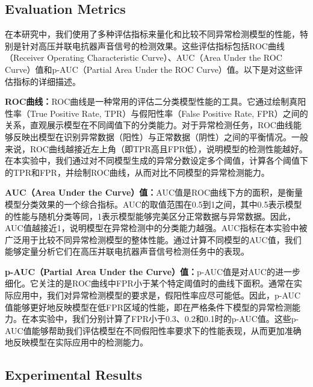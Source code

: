 \documentclass{article}
\begin{document}
\subsection{Evaluation Metrics}

在本研究中，我们使用了多种评估指标来量化和比较不同异常检测模型的性能，特别是针对高压并联电抗器声音信号的检测效果。这些评估指标包括ROC曲线（Receiver Operating Characteristic Curve）、AUC（Area Under the ROC Curve）值和p-AUC（Partial Area Under the ROC Curve）值。以下是对这些评估指标的详细描述。

\textbf{ROC曲线：}ROC曲线是一种常用的评估二分类模型性能的工具。它通过绘制真阳性率（True Positive Rate, TPR）与假阳性率（False Positive Rate, FPR）之间的关系，直观展示模型在不同阈值下的分类能力。对于异常检测任务，ROC曲线能够反映出模型在识别异常数据（阳性）与正常数据（阴性）之间的平衡情况。一般来说，ROC曲线越接近左上角（即TPR高且FPR低），说明模型的检测性能越好。在本实验中，我们通过对不同模型生成的异常分数设定多个阈值，计算各个阈值下的TPR和FPR，并绘制ROC曲线，从而对比不同模型的异常检测能力。

\textbf{AUC（Area Under the Curve）值：}AUC值是ROC曲线下方的面积，是衡量模型分类效果的一个综合指标。AUC的取值范围在0.5到1之间，其中0.5表示模型的性能与随机分类等同，1表示模型能够完美区分正常数据与异常数据。因此，AUC值越接近1，说明模型在异常检测中的分类能力越强。AUC指标在本实验中被广泛用于比较不同异常检测模型的整体性能。通过计算不同模型的AUC值，我们能够定量分析它们在高压并联电抗器声音信号检测任务中的表现。

\textbf{p-AUC（Partial Area Under the Curve）值：}p-AUC值是对AUC的进一步细化。它关注的是ROC曲线中FPR小于某个特定阈值时的曲线下面积。通常在实际应用中，我们对异常检测模型的要求是，假阳性率应尽可能低。因此，p-AUC值能够更好地反映模型在低FPR区域的性能，即在严格条件下模型的异常检测能力。在本实验中，我们分别计算了FPR小于0.3、0.2和0.1时的p-AUC值。这些p-AUC值能够帮助我们评估模型在不同假阳性率要求下的性能表现，从而更加准确地反映模型在实际应用中的检测能力。


\subsection{Experimental Results}
\end{document}
